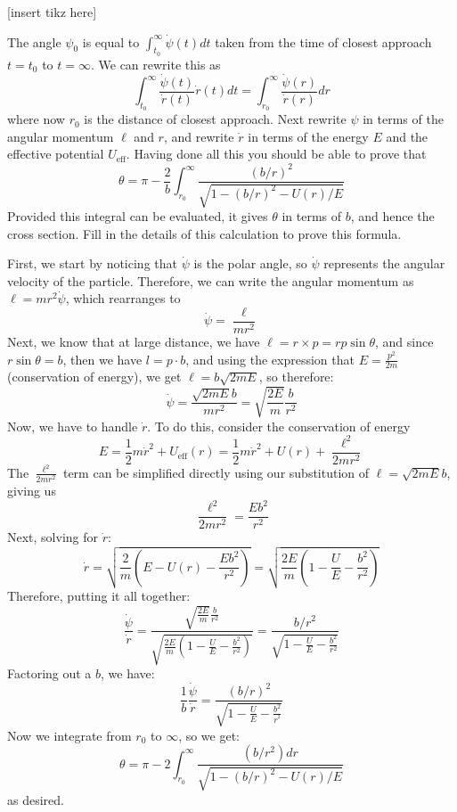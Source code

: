 \documentclass[10pt]{article}
\begin{document}
	[insert tikz here] 

	The angle $\psi_0$ is equal to $\int_{t_0}^\infty \dot \psi(t) dt$ taken from the time of closest approach
	$t = t_0$ to $t = \infty$. We can rewrite this as
	\[
		\int_{t_0}^\infty \frac{\dot \psi(t)}{\dot r(t)}\dot r(t) dt = \int_{r_0}^\infty
		\frac{\dot \psi(r)}{\dot r(r)} dr
	\] 
	where now $r_0$ is the distance of closest approach. Next rewrite $\psi$ in terms of the angular momentum 
	$\ell$ and $r$, and rewrite $\dot r$ in terms of the energy $E$ and the effective potential $U_{\text{eff}}$. Having
	done all this you should be able to prove that 
	\[
	\theta = \pi - \frac{2}{b} \int_{r_0}^\infty \frac{(b/r)^2}{\sqrt{1 - (b/r)^2 - U(r)/E}} 
	\] 
	Provided this integral can be evaluated, it gives $\theta$ in terms of $b$, and hence the cross section. Fill
	in the details of this calculation to prove this formula. 

	\begin{solution}
		First, we start by noticing that $\dot \psi$ is the polar angle, so $\dot \psi$ represents
		the angular velocity of the particle. Therefore, we can write the angular momentum as $\ell = 
		mr^2 \dot \psi$, which rearranges to
		\[
		\dot \psi = \frac{\ell}{mr^2}
		\] 
		Next, we know that at large distance, we have $\ell = r \times p = rp \sin \theta$, and since $r \sin 
		\theta = b$, then we have $l = p \cdot b$, and using the expression that $E = \frac{p^2}{2m}$ 
		(conservation of energy), we get $\ell =b \sqrt{2mE}$, so therefore:
		\[
		\dot \psi = \frac{\sqrt{2mE} b}{mr^2} = \sqrt{\frac{2E}{m}} \frac{b}{r^2}
		\] 
		Now, we have to handle $\dot r$. To do this, consider the conservation of energy
		\[
			E = \frac{1}{2}m \dot r^2 + U_{\text{eff}}(r) = \frac{1}{2}m \dot r^2 + U(r) + \frac{\ell^2}{2m
			r^2}
		\] 
		The $\frac{\ell^2}{2mr^2}$ term can be simplified directly using our substitution of $\ell = \sqrt{
		2mE} b$, giving us 
		\[
		\frac{\ell^2}{2mr^2} = \frac{Eb^2}{r^2}
		\] 
		Next, solving for $\dot r$:
		\[
		\dot r = \sqrt{\frac{2}{m}\left( E - U(r) - \frac{Eb^2}{r^2} \right) } = \sqrt{\frac{2E}{m}
		\left( 1 - \frac{U}{E} - \frac{b^2}{r^2} \right) } 
		\]
		Therefore, putting it all together: 
		\[
			\frac{\dot \psi}{\dot r} = \frac{\sqrt{\frac{2E}{m}} \frac{b}{r^2}}{\sqrt{\frac{2E}{m}\left( 1 - 
			\frac{U}{E} - \frac{b^2}{r^2} \right) }} = \frac{b/r^2}{\sqrt{1 - \frac{U}{E} - \frac{b^2}{r^2}}}
		\] 
		Factoring out a $b$, we have:
		\[
			\frac{1}{b}\frac{\dot \psi}{\dot r} = \frac{(b/r)^2}{\sqrt{1 - \frac{U}{E} - \frac{b^2}{r^^2}}}
		\] 
		Now we integrate from $r_0$ to $\infty$, so we get:
		\[
			\theta = \pi - 2 \int_{r_0}^\infty \frac{(b/r^2) dr}{\sqrt{1 - (b/r)^2 - U(r)/E} }
		\]
		as desired.
	\end{solution}
	 
\end{document}
